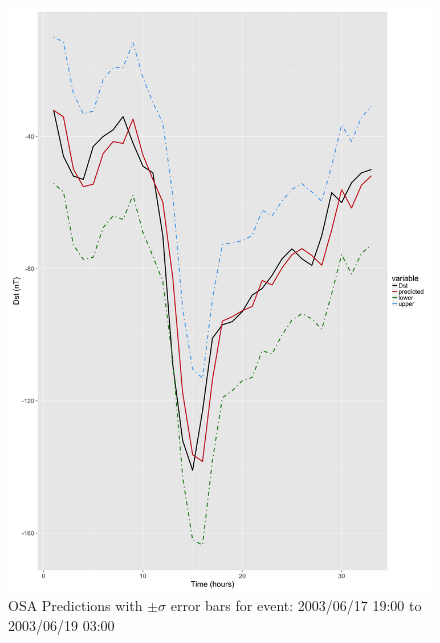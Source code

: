 \documentclass[sw, draft]{AGUTeX}
\begin{document}
\begin{figure}
\noindent\includegraphics[width=\textwidth]{PredictionsModel1/PredErrBars_Storm43.png}
\caption{OSA Predictions with $\pm \sigma$ error bars for event: 2003/06/17 19:00 to 2003/06/19 03:00}
\label{fig:ComparePred1}
\end{figure}
\end{document}
